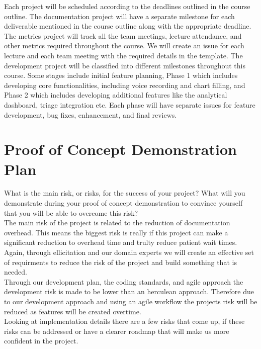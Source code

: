 \documentclass{article}
\begin{document}
Each project will be scheduled according to the deadlines outlined in the course outline. The documentation project will have a separate milestone for each deliverable mentioned in the course outline along with the appropriate deadline. The metrics project will track all the team meetings, lecture attendance, and other metrics required throughout the course. We will create an issue for each lecture and each team meeting with the required details in the template. The development project will be classified into different milestones throughout this course. Some stages include initial feature planning, Phase 1 which includes developing core functionalities, including voice recording and chart filling, and Phase 2 which includes developing additional features like the analytical dashboard, triage integration etc. Each phase will have separate issues for feature development, bug fixes, enhancement, and final reviews. 

\section{Proof of Concept Demonstration Plan}

What is the main risk, or risks, for the success of your project?  What will you
demonstrate during your proof of concept demonstration to convince yourself that
you will be able to overcome this risk?\\

The main risk of the project is related to the reduction of documentation overhead. This means the biggest risk is really if this project can make a significant reduction to overhead time and trulty reduce patient wait times. Again, through ellicitation and our domain experts we will create an effective set of requirments to reduce the risk of the project and build something that is needed.\\

Through our development plan, the coding standards, and agile approach the development risk is made to be lower than an herculean approach. Therefore due to our development approach and using an agile workflow the projects risk will be reduced as features will be created overtime.\\

Looking at implementation details there are a few risks that come up, if these risks can be addressed or have a clearer roadmap that will make us more confident in the project. 
\end{document}
